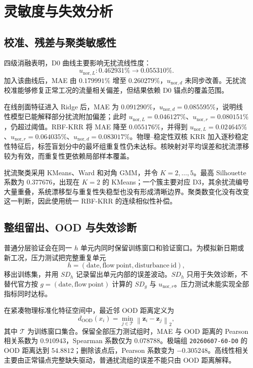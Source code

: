 \section{灵敏度与失效分析}

\subsection{校准、残差与聚类敏感性}

四级消融表明，D0 曲线主要影响无扰流线性度：
\begin{equation}
u_{\mathrm{nor},L}: 0.462931\%\longrightarrow 0.055310\%.
\end{equation}
加入该曲线后，MAE 由 $0.179991\%$ 增至 $0.260279\%$，$u_{\mathrm{nor},d}$ 未同步改善。无扰流校准能够修复正常工况的流量相关偏差，但结果依赖 D0 锚点的覆盖范围。

在线剖面特征进入 Ridge 后，MAE 为 $0.091290\%$，$u_{\mathrm{nor},d}=0.085595\%$，说明线性模型已能解释部分扰流附加偏差；此时 $u_{\mathrm{nor},L}=0.046127\%$、$u_{\mathrm{nor},r}=0.080151\%$，仍超过阈值。RBF-KRR 将 MAE 降至 $0.055176\%$，并得到 $u_{\mathrm{nor},L}=0.024645\%$、$u_{\mathrm{nor},r}=0.064035\%$、$u_{\mathrm{nor},d}=0.083017\%$。物理--稳定性双核 KRR 加入逐秒稳定性特征后，标签盲划分中的最坏组重复性仍未达标。核映射对平均误差和扰流漂移较为有效，而重复性更依赖局部样本覆盖。

扰流聚类采用 KMeans、Ward 和对角 GMM，并令 $K=2,\ldots,5$。最高 Silhouette 系数为 $0.377676$，出现在 $K=2$ 的 KMeans；一个簇主要对应 D3，其余扰流编号大量重叠，系统漂移型与重复性失稳型也没有形成清晰边界。聚类数变化没有改变这一判断，因此使用统一 RBF-KRR 的连续相似性补偿。

\subsection{整组留出、OOD 与失效诊断}

普通分层验证会在同一 $h$ 单元内同时保留训练窗口和验证窗口。为模拟新日期或新工况，压力测试把完整重复单元
\begin{equation}
h=(\mathrm{date},\mathrm{flow\ point},\mathrm{disturbance\ id}),
\end{equation}
移出训练集，并用 $SD_h$ 记录留出单元内部的误差波动。$SD_h$ 只用于失效诊断，不替代官方按 $g=(\mathrm{date},\mathrm{flow\ point})$ 计算的 $SD_g$ 与 $u_{\mathrm{nor},r}$。压力测试未能实现全部指标同时达标。

在紧凑物理标准化特征空间中，最近邻 OOD 距离定义为
\begin{equation}
d_{\mathrm{OOD}}(x_i)=\min_{j\in \mathcal{T}}
\left\|\boldsymbol z_i-\boldsymbol z_j\right\|_2,
\end{equation}
其中 $\mathcal{T}$ 为训练窗口集合。保留全部压力测试组时，MAE 与 OOD 距离的 Pearson 相关系数为 $0.910943$，Spearman 系数仅为 $0.078788$。极端组 \texttt{20260607-60-D0} 的 OOD 距离达到 $54.8812$；删除该点后，Pearson 系数变为 $-0.305248$。高线性相关主要由正常锚点完整缺失驱动，普通扰流组的误差不能只由 OOD 距离解释。

